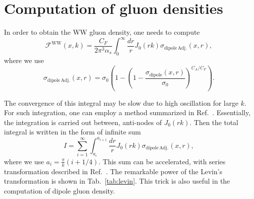 \documentclass[a4,12pt]{article}
\newcommand{\fww}[0]{\mathcal{F}^{\mathrm{WW}}}
\newcommand{\sdp}[0]{\sigma_{\mathrm{dipole}}}
\newcommand{\sdpa}[0]{\sigma_{\mathrm{dipole\,Adj.}}}
\begin{document}
\begin{figure}
	\begin{subfigure}{0.5\textwidth}
		 
	\end{subfigure}
	\begin{subfigure}{0.5\textwidth}
		 
	\end{subfigure}
	
	\begin{subfigure}{0.5\textwidth}
		
	\end{subfigure}
	\begin{subfigure}{\textwidth}
		
	\end{subfigure}
	
	\begin{subfigure}{0.5\textwidth}
		
	\end{subfigure}
	\begin{subfigure}{\textwidth}
		
	\end{subfigure}
\end{figure}
	
\appendix	
\section{Computation of gluon densities}
In order to obtain the WW gluon density, one needs to compute 
\begin{equation}
	\fww(x,k)= \frac{C_F}{2\pi^3\alpha_s}\int^\infty_0\frac{dr}{r}J_0(r k) \sdpa(x,r),
\end{equation} 	
where we use 
\begin{equation}
	\sdpa(x,r)=\sigma_0\left( 1-\left(1-\frac{\sdp(x,r)}{\sigma_0}\right)^{C_A/C_F}\right).
\end{equation}

The convergence of this integral may be slow due to high oscillation for large $k$.
For such integration, one can employ a method summarized in Ref.~\cite{LYNESS1985109}. 
Essentially, the integration is carried out between, anti-nodes of $J_0(rk)$. Then the total integral is written in the form of infinite sum
\begin{equation}
	I=\sum^\infty_{i=1} \int^{a_{i+1}}_{a_i} \frac{dr}{r}J_0(r k) \sdpa(x,r),
\end{equation}
where we use $a_{i}=\frac{\pi}{k}(i+1/4)$.
This sum can be accelerated, with series transformation described in Ref.~\cite{doi:10.1080/00207167308803075,Weniger:1989rea,HOMEIER19951}.
The remarkable power of the Levin's transformation is shown in Tab.~\ref{tab:levin}.
This trick is also useful in the computation of dipole gluon density. 
\end{document}
